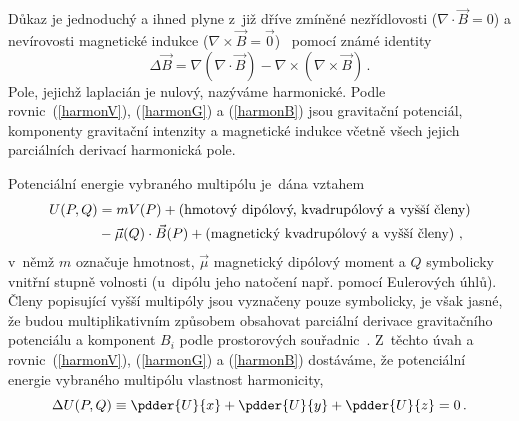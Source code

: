 Důkaz je jednoduchý a ihned plyne z~již dříve zmíněné nezřídlovosti
($\nabla\cdot\vec{B}=0$) a nevírovosti magnetické indukce
($\nabla\times\vec{B}=\vec{0}$)~\cite{Hab:1999:MgrDP:ProbUlFyzPrakt} pomocí
známé identity~\cite{Pur-Mor:2013:ElectMagn:3}
\begin{equation}
  \Delta\vec{B}
  =\nabla(\nabla\cdot\vec{B})-\nabla\times(\nabla\times\vec{B})\,.\label{Errgdl}
\end{equation}
Pole, jejichž laplacián je nulový, nazýváme harmonické. Podle
rovnic~(\ref{harmonV}), (\ref{harmonG}) a (\ref{harmonB}) jsou gravitační
potenciál, komponenty gravitační intenzity a magnetické indukce včetně všech
jejich parciálních derivací harmonická pole.

Potenciální energie vybraného multipólu je~dána
vztahem~\cite{Pur-Mor:2013:ElectMagn:3}
\begin{align}
  U(P,Q) &= mV(P) + \left(\text{hmotový dipólový, kvadrupólový
   a vyšší členy}\right)\notag\\
         &- \vec{\mu}(Q)\cdot\vec{B}(P)
   + \left(\text{magnetický kvadrupólový a vyšší členy}\right)\,,  \label{PotEn}
\end{align}
v~němž $m$ označuje hmotnost, $\vec{\mu}$ magnetický dipólový moment a $Q$
symbolicky vnitřní stupně volnosti (u~dipólu jeho natočení např. pomocí
Eulerových úhlů). Členy popisující vyšší multipóly jsou vyznačeny pouze
symbolicky, je však jasné, že budou multiplikativním způsobem obsahovat
parciální derivace gravitačního potenciálu a komponent $B_{i}$ podle
prostorových souřadnic~\cite{Lan-Lif:1980:2-ClasTheField:4}. Z~těchto úvah
a rovnic~(\ref{harmonV}), (\ref{harmonG}) a (\ref{harmonB}) dostáváme, že
potenciální energie vybraného multipólu  vlastnost harmonicity,
\begin{equation}
  \Delta U(P,Q)\equiv
  \pdder{U}{x} + \pdder{U}{y} + \pdder{U}{z} = 0\,.              \label{harmonU}
\end{equation}

